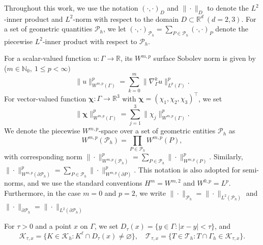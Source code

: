 \documentclass[10pt, a4paper]{amsart}
\newcommand{\bn}{{\bm n}}
\newcommand{\bbR}{\mathbb{R}}
\newcommand{\p}{\partial}
\newcommand{\nab}{\nabla}
\newcommand{\calT}{\mathcal{T}}
\newcommand{\calK}{\mathcal{K}}
\newcommand{\calX}{\mathcal{X}}
\newcommand{\calP}{\mathcal{P}}
\newcommand{\bchi}{{\bm \chi}}
\theoremstyle{definition}
\theoremstyle{remark}
\theoremstyle{example}
\numberwithin{equation}{section}
\begin{document}
Throughout this work, we use the notation
$(\cdot,\cdot)_D$ and $\|\cdot\|_D$ to denote the $L^2$-inner product
and $L^2$-norm with respect to the domain $D\subset \bbR^d\ (d=2,3)$.
For a set of geometric quantities $\calP_h$, we let $(\cdot,\cdot)_{\calP_h}
 = \sum_{P\in \calP_h} (\cdot,\cdot)_P$ 
denote the piecewise $L^2$-inner product with respect to $\calP_h$.


For a scalar-valued function $u: \Gamma \rightarrow \bbR$, 
its $W^{m,p}$ surface Sobolev norm is given by ($m\in \mathbb{N}_0,\ 1\le p<\infty)$
\[
\|u\|_{W^{m, p}(\Gamma)}^p
= \sum_{k = 0}^m\|\nab_\Gamma^ku\|_{L^p(\Gamma)}^p.
\]
For vector-valued function $\bchi: \Gamma \rightarrow \bbR^3$ with $\bchi = (\chi_1,\chi_2,\chi_3)^\intercal$, we set
\[
\|\bchi\|_{W^{m, p}(\Gamma)}^p
= \sum_{j = 1}^3\|\chi_j\|_{W^{m, p}(\Gamma)}^p.
\]
%
We  denote the piecewise $W^{m,p}$-space over a 
set of geometric entities $\calP_h$ as
\[
W^{m,p}(\calP_h) = \prod_{P\in \calP_h} W^{m,p}(P),
\]
with corresponding norm
$\|\cdot\|_{W^{m,p}(\calP_h)}^p = \sum_{P \in \calP_h}\|\cdot\|_{W^{m,p}(P)}^p$.
Similarly, $\|\cdot\|_{W^{m,p}(\partial\calP_h)}^p = \sum_{P \in \calP_h}\|\cdot\|_{W^{m,p}(\partial P)}^p$. 
This notation is also adopted for semi-norms, and we use the standard conventions $H^m = W^{m,2}$ and $W^{0,p} = L^p$. Furthermore, in the case $m=0$ and $p=2$, we write
$\|\cdot\|_{\calP_h} = \|\cdot\|_{L^2(\calP_h)}$
and $\|\cdot\|_{\p\calP_h} = \|\cdot\|_{L^2(\p \calP_h)}$


%


For  $\tau > 0$ and a point $x$ on $\Gamma$, we set $D_\tau(x) =\{y \in \Gamma: |x - y| < \tau\}$,
and
\[
\calK_{\tau, x} = \{K \in \calK_h: K^\ell \cap D_\tau(x) \neq \varnothing\}, \quad \calT_{\tau, x} = \{T \in \calT_h: T \cap \Gamma_h \in \calK_{\tau, x}\}.
\]
\end{document}
